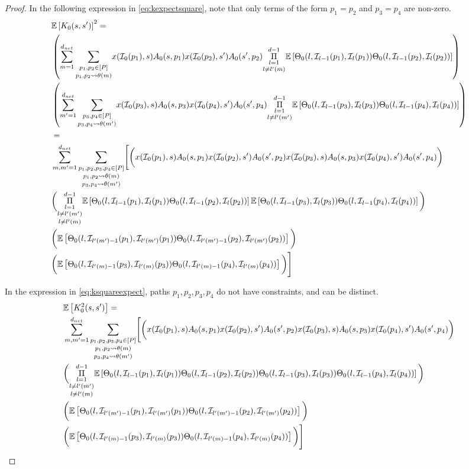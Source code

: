 \begin{proof}
In the following expression in \eqref{eq:kexpectsquare}, note that only terms of the form $p_1=p_2$ and $p_3=p_4$ are non-zero.
\begin{align}\label{eq:kexpectsquare}
&\mathbb{E}\left[K_0(s,s')\right]^2=\nonumber\\
&\left(\sum_{m=1}^{d_{net}}\underset{p_1,p_2\rightsquigarrow\theta(m)}{\sum_{p_1,p_2\in[P]}}x(\mathcal{I}_0(p_1),s)A_0(s,p_1)x(\mathcal{I}_0(p_2),s')A_0(s',p_2) \underset{l\neq l'(m)}{\underset{l=1}{\overset{d-1}{\Pi}}} \mathbb{E}\left[{\Theta}_0(l,\mathcal{I}_{l-1}(p_1),\mathcal{I}_{l}(p_1)) {\Theta}_0(l,\mathcal{I}_{l-1}(p_2),\mathcal{I}_{l}(p_2))\right]\right)\nonumber\\
&\left(\sum_{m'=1}^{d_{net}}\underset{p_3,p_4\rightsquigarrow\theta(m')}{\sum_{p_3,p_4\in[P]}}x(\mathcal{I}_0(p_3),s)A_0(s,p_3)x(\mathcal{I}_0(p_4),s')A_0(s',p_4) \underset{l\neq l'(m')}{\underset{l=1}{\overset{d-1}{\Pi}}} \mathbb{E}\left[{\Theta}_0(l,\mathcal{I}_{l-1}(p_3),\mathcal{I}_{l}(p_3)) {\Theta}_0(l,\mathcal{I}_{l-1}(p_4),\mathcal{I}_{l}(p_4))\right]\right)\nonumber\\
&=\nonumber\\
&\sum_{m,m'=1}^{d_{net}}\underset{p_3,p_4\rightsquigarrow\theta(m')}{\underset{p_1,p_2\rightsquigarrow\theta(m)}{\sum_{p_1,p_2,p_3,p_4\in[P]}}}\Bigg[\bigg(x(\mathcal{I}_0(p_1),s)A_0(s,p_1)x(\mathcal{I}_0(p_2),s')A_0(s',p_2)x(\mathcal{I}_0(p_3),s)A_0(s,p_3)x(\mathcal{I}_0(p_4),s')A_0(s',p_4)\bigg)\nonumber\\
&\bigg( \underset{l\neq l'(m)} {\underset{l\neq l'(m')}{\underset{l=1}{\overset{d-1}{\Pi}}}} \mathbb{E}\left[{\Theta}_0(l,\mathcal{I}_{l-1}(p_1),\mathcal{I}_{l}(p_1)) {\Theta}_0(l,\mathcal{I}_{l-1}(p_2),\mathcal{I}_{l}(p_2))\right]\mathbb{E}\left[{\Theta}_0(l,\mathcal{I}_{l-1}(p_3),\mathcal{I}_{l}(p_3)) {\Theta}_0(l,\mathcal{I}_{l-1}(p_4),\mathcal{I}_{l}(p_4))\right] \bigg)\nonumber\\
&\bigg( \mathbb{E}\left[{\Theta}_0(l,\mathcal{I}_{l'(m')-1}(p_1),\mathcal{I}_{l'(m')}(p_1)) {\Theta}_0(l,\mathcal{I}_{l'(m')-1}(p_2),\mathcal{I}_{l'(m')}(p_2))\right]\bigg)\nonumber\\
&\bigg(\mathbb{E}\left[{\Theta}_0(l,\mathcal{I}_{l'(m)-1}(p_3),\mathcal{I}_{l'(m)}(p_3)) {\Theta}_0(l,\mathcal{I}_{l'(m)-1}(p_4),\mathcal{I}_{l'(m)}(p_4))\right] \bigg)\Bigg]\nonumber\\
\end{align}

In the expression in \eqref{eq:ksquareexpect}, paths $p_1,p_2,p_3,p_4$ do not have constraints, and can be distinct.
\begin{align}\label{eq:ksquareexpect}
&\mathbb{E}\left[K^2_0(s,s')\right]=\nonumber\\
&\sum_{m,m'=1}^{d_{net}}\underset{p_3,p_4\rightsquigarrow\theta(m')}{\underset{p_1,p_2\rightsquigarrow\theta(m)}{\sum_{p_1,p_2,p_3,p_4\in[P]}}}\Bigg[\bigg(x(\mathcal{I}_0(p_1),s)A_0(s,p_1)x(\mathcal{I}_0(p_2),s')A_0(s',p_2)x(\mathcal{I}_0(p_3),s)A_0(s,p_3)x(\mathcal{I}_0(p_4),s')A_0(s',p_4)\bigg)\nonumber\\
&\bigg( \underset{l\neq l'(m)} {\underset{l\neq l'(m')}{\underset{l=1}{\overset{d-1}{\Pi}}}} \mathbb{E}\left[{\Theta}_0(l,\mathcal{I}_{l-1}(p_1),\mathcal{I}_{l}(p_1)) {\Theta}_0(l,\mathcal{I}_{l-1}(p_2),\mathcal{I}_{l}(p_2)){\Theta}_0(l,\mathcal{I}_{l-1}(p_3),\mathcal{I}_{l}(p_3)) {\Theta}_0(l,\mathcal{I}_{l-1}(p_4),\mathcal{I}_{l}(p_4))\right] \bigg)\nonumber\\
&\bigg( \mathbb{E}\left[{\Theta}_0(l,\mathcal{I}_{l'(m')-1}(p_1),\mathcal{I}_{l'(m')}(p_1)) {\Theta}_0(l,\mathcal{I}_{l'(m')-1}(p_2),\mathcal{I}_{l'(m')}(p_2))\right]\bigg)\nonumber\\
&\bigg(\mathbb{E}\left[{\Theta}_0(l,\mathcal{I}_{l'(m)-1}(p_3),\mathcal{I}_{l'(m)}(p_3)) {\Theta}_0(l,\mathcal{I}_{l'(m)-1}(p_4),\mathcal{I}_{l'(m)}(p_4))\right] \bigg)\Bigg]\nonumber\\
\end{align}


\end{proof}

